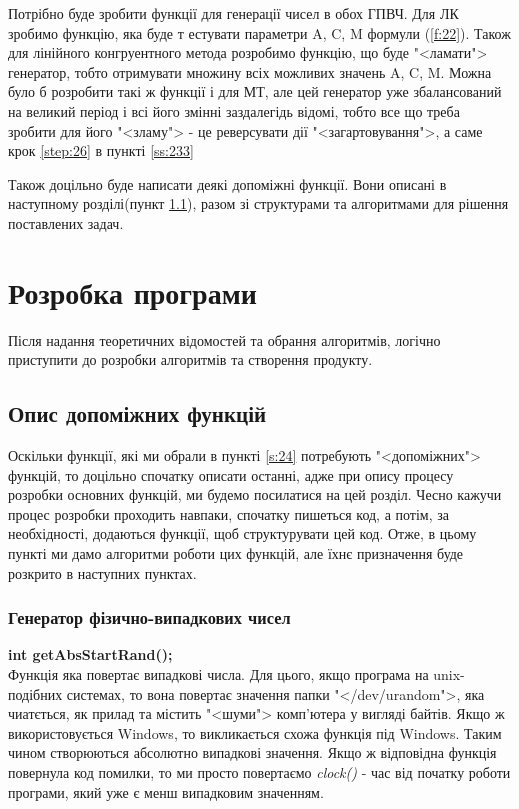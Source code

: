 \documentclass[oneside,final,14pt]{extreport}
\begin{document}
\begin{large}
Потрібно буде зробити функції для генерації чисел в обох ГПВЧ. Для ЛК зробимо функцію, яка буде т
естувати параметри A, C, M формули (\ref{f:22}). Також для лінійного конгруентного метода розробимо функцію,
що буде "<ламати"> генератор, тобто отримувати множину всіх можливих значень A, C, M. Можна було б 
розробити такі ж функції і для МТ, але цей генератор уже збалансований на великий період і 
всі його змінні заздалегідь відомі, тобто все що треба зробити для його "<зламу"> - це реверсувати 
дії "<загартовування">, а саме крок \ref{step:26} в пункті \ref{ss:233}   

Також доцільно буде написати деякі допоміжні функції. Вони описані в наступному розділі(пункт \ref{s:31}), 
разом зі структурами та алгоритмами для рішення поставлених задач.
\chapter{Розробка програми}\label{c:3} 
Після надання теоретичних відомостей та обрання алгоритмів, логічно приступити до 
розробки алгоритмів та створення продукту.
\section{Опис допоміжних функцій}\label{s:31}
Оскільки функції, які ми обрали в пункті \ref{s:24} потребують "<допоміжних"> функцій, 
то доцільно спочатку описати останні, адже при опису процесу розробки основних функцій, ми 
будемо посилатися на цей розділ. Чесно кажучи процес розробки проходить навпаки, спочатку 
пишеться код, а потім, за необхідності, додаються функції, щоб структурувати цей код. 
Отже, в цьому пункті ми дамо алгоритми роботи цих функцій, але їхнє призначення
 буде розкрито в наступних пунктах.
\subsection{Генератор фізично-випадкових чисел}\label{ss:311}
{\bfseries
int getAbsStartRand();}\\
	Функція яка повертає випадкові числа. Для цього, якщо програма на unix-подібних системах, 
	то вона повертає значення папки "</dev/urandom">, яка чиатється, як прилад та містить 
	"<шуми"> комп'ютера у вигляді байтів. Якщо ж використовується Windows, то викликається 
	схожа функція під Windows. Таким чином створюються абсолютно випадкові значення. Якщо ж 
	відповідна функція повернула код помилки, то ми просто повертаємо {\itshape clock()} - час від початку 
	роботи програми, який уже є менш випадковим значенням.  


\end{large}
\end{document}
